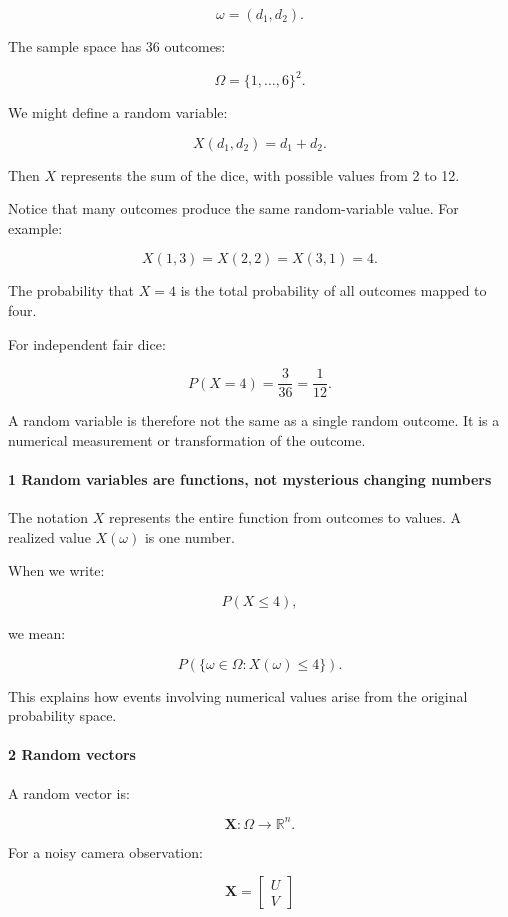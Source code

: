 \[
 \omega=(d_1,d_2).
\]

The sample space has 36 outcomes:

\[
 \Omega=\{1,\ldots,6\}^2.
\]

We might define a random variable:

\[
 X(d_1,d_2)=d_1+d_2.
\]

Then \(X\) represents the sum of the dice, with possible values from 2 to 12.

Notice that many outcomes produce the same random-variable value. For example:

\[
 X(1,3)=X(2,2)=X(3,1)=4.
\]

The probability that \(X=4\) is the total probability of all outcomes mapped to four.

For independent fair dice:

\[
 P(X=4)=\frac3{36}=\frac1{12}.
\]

A random variable is therefore not the same as a single random outcome. It is a numerical measurement or transformation of the outcome.

\paragraph{1 Random variables are functions, not mysterious changing numbers}\label{random-variables-are-functions-not-mysterious-changing-numbers}

The notation \(X\) represents the entire function from outcomes to values. A realized value \(X(\omega)\) is one number.

When we write:

\[
 P(X\le4),
\]

we mean:

\[
 P(\{\omega\in\Omega:X(\omega)\le4\}).
\]

This explains how events involving numerical values arise from the original probability space.

\paragraph{2 Random vectors}\label{random-vectors}

A random vector is:

\[
 \mathbf X:\Omega\rightarrow\mathbb R^n.
\]

For a noisy camera observation:

\[
 \mathbf X= \begin{bmatrix} U\\V \end{bmatrix}
\]

